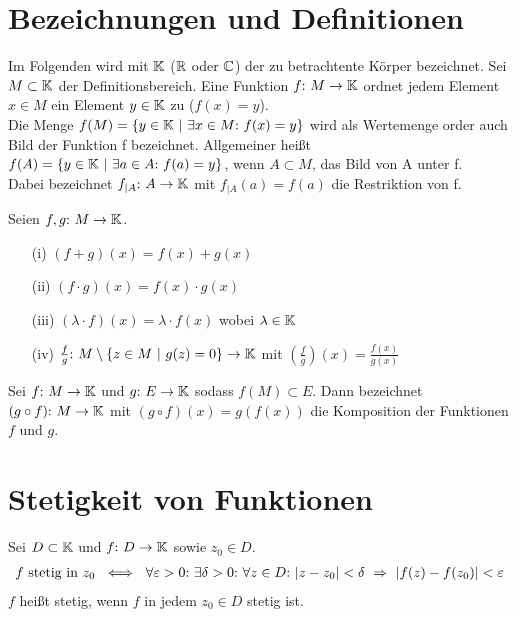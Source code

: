 \section{Bezeichnungen und Definitionen}

Im Folgenden wird mit $\mathbb{K}$ ($\mathbb{R}$ oder $\mathbb{C}$) der zu betrachtente Körper bezeichnet. Sei $M \subset \mathbb{K}$ der Definitionsbereich. Eine Funktion $f{:}\  M \to \mathbb{K}$ ordnet jedem Element $x \in M$ ein Element $y \in \mathbb{K}$ zu ($f(x) = y$).\\
Die Menge $f(M) = \{y\in \mathbb{K} \ |\ \exists x \in M{:}\  f(x)=y\}$ wird als Wertemenge order auch Bild der Funktion f bezeichnet. Allgemeiner heißt $f(A) = \{y\in \mathbb{K} \ |\ \exists a \in A{:}\  f(a)=y\}$, wenn $A \subset M$, das Bild von A unter f.\\
Dabei bezeichnet $f_{|A}{:}\  A \to \mathbb{K}$ mit $f_{|A}(a) = f(a)$ die Restriktion von f. 

\begin{frameddefn}
	Seien $f,g{:}\  M \to \mathbb{K}$.
	\begin{enumerate}
		\item[(i)] $(f+g)(x) = f(x) + g(x)$
		\item[(ii)] $(f\cdot g)(x) = f(x) \cdot g(x)$
		\item[(iii)] $(\lambda \cdot f)(x) = \lambda\cdot f(x)$ wobei $\lambda \in \mathbb{K}$
		\item[(iv)] $\frac{f}{g}{:}\  M\setminus\{z \in M\ |\ g(z)=0\} \to \mathbb{K}$ mit $\left(\frac{f}{g}\right)(x)= \frac{f(x)}{g(x)}$
	\end{enumerate}
\end{frameddefn}

\begin{frameddefn}
	Sei $f{:}\  M \to \mathbb{K}$ und $g{:}\  E \to \mathbb{K}$ sodass $f(M) \subset E$. Dann bezeichnet $(g \circ f){:}\  M \to \mathbb{K}$ mit $(g \circ f)(x)=g(f(x))$ die Komposition der Funktionen $f$ und $g$.
\end{frameddefn}

\newpage
\section{Stetigkeit von Funktionen}

\begin{frameddefn}
	Sei $D \subset \mathbb{K}$ und $f{:}\  D \to \mathbb{K}$ sowie $z_0 \in D$.
	\begin{align*}
		f \textrm{ stetig in } z_0 \ \iff \ \forall \varepsilon > 0\st \exists \delta > 0\st \forall z \in D\st |z-z_0| < \delta \ \Rightarrow\ |f(z)-f(z_0)| < \varepsilon
	\end{align*}
	$f$ heißt stetig, wenn $f$ in jedem $z_0 \in D$ stetig ist. 
\end{frameddefn}

